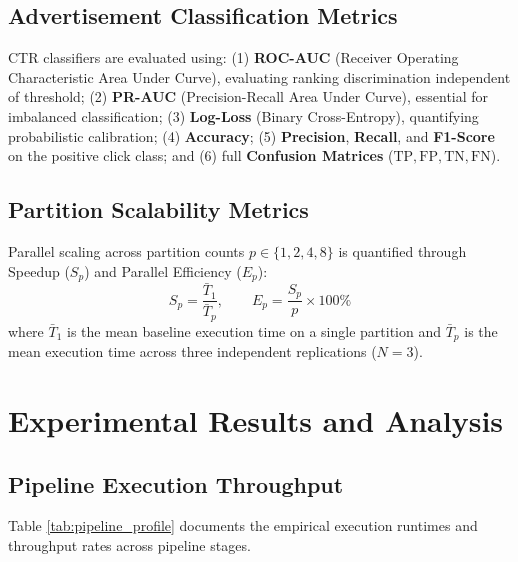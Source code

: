 \documentclass[10pt,a4paper,twoside]{article}
\begin{document}
\subsection{Advertisement Classification Metrics}
CTR classifiers are evaluated using: (1) \textbf{ROC-AUC} (Receiver Operating Characteristic Area Under Curve), evaluating ranking discrimination independent of threshold; (2) \textbf{PR-AUC} (Precision-Recall Area Under Curve), essential for imbalanced classification; (3) \textbf{Log-Loss} (Binary Cross-Entropy), quantifying probabilistic calibration; (4) \textbf{Accuracy}; (5) \textbf{Precision}, \textbf{Recall}, and \textbf{F1-Score} on the positive click class; and (6) full \textbf{Confusion Matrices} ($\text{TP}, \text{FP}, \text{TN}, \text{FN}$).

\subsection{Partition Scalability Metrics}
Parallel scaling across partition counts $p \in \{1, 2, 4, 8\}$ is quantified through Speedup ($S_p$) and Parallel Efficiency ($E_p$):
\begin{equation}
S_p = \frac{\bar{T}_1}{\bar{T}_p}, \qquad E_p = \frac{S_p}{p} \times 100\%
\end{equation}
where $\bar{T}_1$ is the mean baseline execution time on a single partition and $\bar{T}_p$ is the mean execution time across three independent replications ($N = 3$).

\section{Experimental Results and Analysis}

\subsection{Pipeline Execution Throughput}
Table \ref{tab:pipeline_profile} documents the empirical execution runtimes and throughput rates across pipeline stages.
\end{document}
